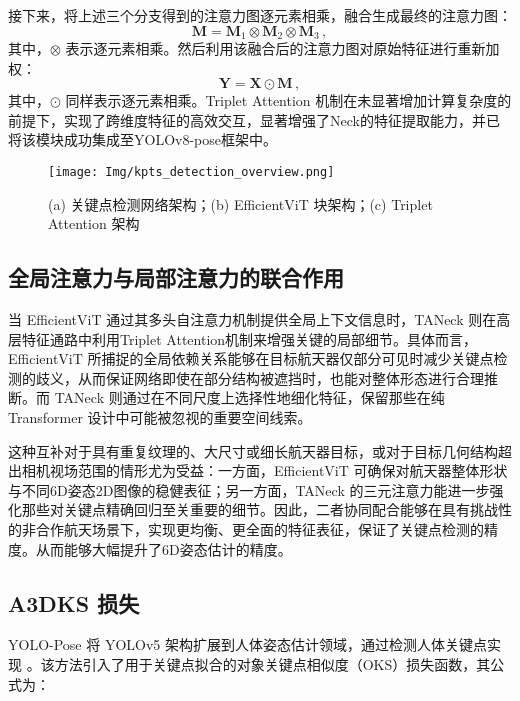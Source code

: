 接下来，将上述三个分支得到的注意力图逐元素相乘，融合生成最终的注意力图：
\begin{equation} 
	\mathbf{M} = \mathbf{M}_{1} \otimes \mathbf{M}_{2} \otimes \mathbf{M}_{3}\,,
\end{equation}
其中，$\otimes$ 表示逐元素相乘。然后利用该融合后的注意力图对原始特征进行重新加权：
\begin{equation} 
	\mathbf{Y} = \mathbf{X} \odot \mathbf{M}\,,
\end{equation}
其中，$\odot$ 同样表示逐元素相乘。Triplet Attention 机制在未显著增加计算复杂度的前提下，实现了跨维度特征的高效交互，显著增强了Neck的特征提取能力，并已将该模块成功集成至YOLOv8-pose框架中。

\begin{figure}[htbp]
	\centering
	\texttt{[image: Img/kpts\_detection\_overview.png]}
	\caption{(a) 关键点检测网络架构；(b) EfficientViT 块架构；(c) Triplet Attention 架构}
	\label{fig:keypoint_detection_neural_network}
	\vspace{-3ex}
\end{figure}


\subsection{全局注意力与局部注意力的联合作用}
当 EfficientViT 通过其多头自注意力机制提供全局上下文信息时，TANeck 则在高层特征通路中利用Triplet Attention机制来增强关键的局部细节。具体而言，EfficientViT 所捕捉的全局依赖关系能够在目标航天器仅部分可见时减少关键点检测的歧义，从而保证网络即使在部分结构被遮挡时，也能对整体形态进行合理推断。而 TANeck 则通过在不同尺度上选择性地细化特征，保留那些在纯 Transformer 设计中可能被忽视的重要空间线索。

这种互补对于具有重复纹理的、大尺寸或细长航天器目标，或对于目标几何结构超出相机视场范围的情形尤为受益：一方面，EfficientViT 可确保对航天器整体形状与不同6D姿态2D图像的稳健表征；另一方面，TANeck 的三元注意力能进一步强化那些对关键点精确回归至关重要的细节。因此，二者协同配合能够在具有挑战性的非合作航天场景下，实现更均衡、更全面的特征表征，保证了关键点检测的精度。从而能够大幅提升了6D姿态估计的精度。
\subsection{A3DKS 损失}


YOLO-Pose 将 YOLOv5 架构扩展到人体姿态估计领域，通过检测人体关键点实现 \citep{yolo_pose}。该方法引入了用于关键点拟合的对象关键点相似度（OKS）损失函数，其公式为：

